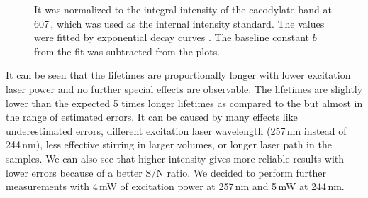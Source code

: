 \begin{figure}
	\centering
	
	\caption[%
		Decrease of the integral intensity of the polyU band at 1231\,\icm{}
		for different excitation laser powers in raw spectra using
		backscattering geometry.%
	]{%
		It was normalized to the integral intensity of the cacodylate band at
		607\,\icm{}, which was used as the internal intensity standard.
		The values were fitted by exponential decay curves
		.
		The baseline constant $b$ from the fit was subtracted from the plots.
	}
	\label{\figlabel{power_optim:hairpins}}
\end{figure}

\begin{table}
	\centering
	
	\caption[%
		Lifetimes of the polyU in dependence on excitation power
		estimated from raw spectra in backscattering geometry.%
	]{%
		$E_0$ are total energies accumulated by detector divided by maximal value
		across all the excitation powers $P$.
	}
	\label{\tablabel{power_optim:lifetimes_hairpins}}
\end{table}

It can be seen that the lifetimes are proportionally longer with lower
excitation laser power and no further special effects are observable.
The lifetimes are slightly lower than the expected 5 times longer lifetimes as
compared to the
but almost in the range of estimated errors.
It can be caused by many effects like underestimated errors, different
excitation laser wavelength (257\,nm instead of 244\,nm), less effective
stirring in larger volumes, or longer laser path in the samples.
We can also see that higher intensity gives more reliable results with
lower errors because of a better S/N ratio.
We decided to perform further measurements with 4\,mW of excitation power at
257\,nm and 5\,mW at 244\,nm.
